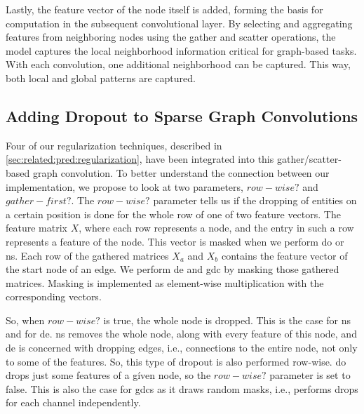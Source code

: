Lastly, the feature vector of the node itself is added, forming the basis for computation in the subsequent convolutional layer.
By selecting and aggregating features from neighboring nodes using the gather and scatter operations, the model captures the local neighborhood information critical for graph-based tasks.
With each convolution, one additional neighborhood can be captured.
This way, both local and global patterns are captured.


\subsection{Adding Dropout to Sparse Graph Convolutions}
\label{sec:implement:gnndropout:dropout}
Four of our regularization techniques, described in \cref{sec:related:pred:regularization}, have been integrated into this gather/scatter-based graph convolution.
To better understand the connection between our implementation, we propose to look at two parameters, $\mathit{row-wise?}$ and $\mathit{gather-first?}$.
The $\mathit{row-wise?}$ parameter tells us if the dropping of entities on a certain position is done for the whole row of one of two feature vectors.
The feature matrix $X$, where each row represents a node, and the entry in such a row represents a feature of the node.
This vector is masked when we perform \ac{do} or \ac{ns}.
Each row of the gathered matrices $X_a$ and $X_b$ contains the feature vector of the start node of an edge.
We perform \ac{de} and \ac{gdc} by masking those gathered matrices.
Masking is implemented as element-wise multiplication with the corresponding vectors.

So, when $\mathit{row-wise?}$ is true, the whole node is dropped.
This is the case for \acf{ns} and for \acf{de}. \Ac{ns} removes the whole node, along with every feature of this node, and \ac{de} is concerned with dropping edges, i.e., connections to the entire node, not only to some of the features.
So, this type of dropout is also performed row-wise.
\Acf{do} drops just some features of a gíven node, so the $\mathit{row-wise?}$ parameter is set to false.
This is also the case for \acp{gdc} as it draws random masks, i.e., performs drops for each channel independently.

